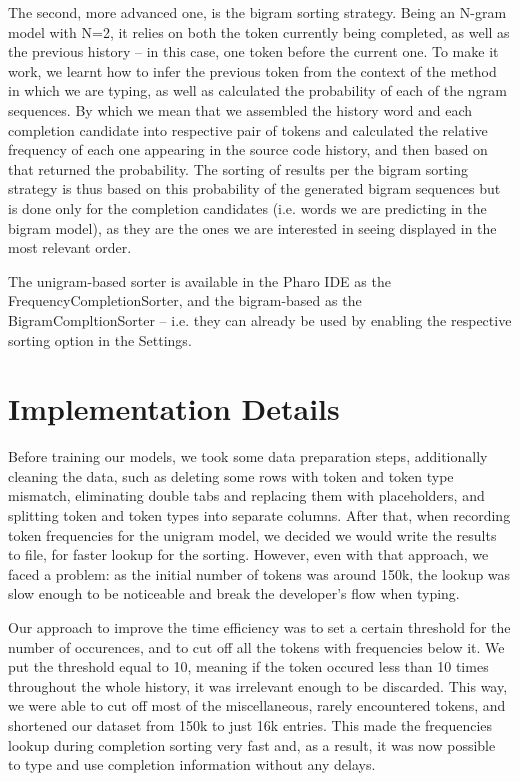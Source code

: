 The second, more advanced one, is the bigram sorting strategy. Being an N-gram model with N=2, it relies on both the token currently being completed, as well as the previous history -- in this case, one token before the current one. To make it work, we learnt how to infer the previous token from the context of the method in which we are typing, as well as calculated the probability of each of the ngram sequences. By which we mean that we assembled the history word and each completion candidate into respective pair of tokens and calculated the relative frequency of each one appearing in the source code history, and then based on that returned the probability. The sorting of results per the bigram sorting strategy is thus based on this probability of the generated bigram sequences but is done only for the completion candidates (i.e. words we are predicting in the bigram model), as they are the ones we are interested in seeing displayed in the most relevant order.

The unigram-based sorter is available in the Pharo IDE as the FrequencyCompletionSorter, and the bigram-based as the BigramCompltionSorter -- i.e. they can already be used by enabling the respective sorting option in the Settings. 

\section{Implementation Details}
Before training our models, we took some data preparation steps, additionally cleaning the data, such as deleting some rows with token and token type mismatch, eliminating double tabs and replacing them with placeholders, and splitting token and token types into separate columns. After that, when recording token frequencies for the unigram model, we decided we would write the results to file, for faster lookup for the sorting. However, even with that approach, we faced a problem: as the initial number of tokens was around 150k, the lookup was slow enough to be noticeable and break the developer's flow when typing. 

Our approach to improve the time efficiency was to set a certain threshold for the number of occurences, and to cut off all the tokens with frequencies below it. We put the threshold equal to 10, meaning if the token occured less than 10 times throughout the whole history, it was irrelevant enough to be discarded. This way, we were able to cut off most of the miscellaneous, rarely encountered tokens, and shortened our dataset from 150k to just 16k entries. This made the frequencies lookup during completion sorting very fast and, as a result, it was now possible to type and use completion information without any delays.

